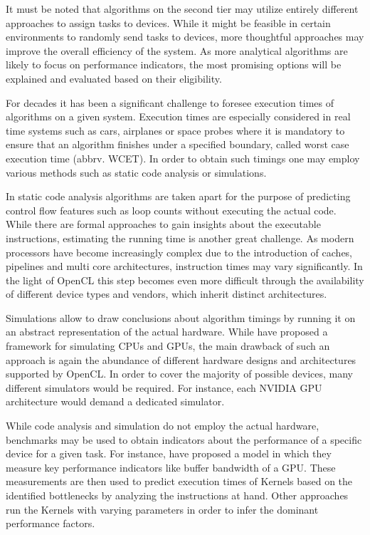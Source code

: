 It must be noted that algorithms on the second tier may utilize entirely different approaches to assign tasks to devices. While it might be feasible in certain environments to randomly send tasks to devices, more thoughtful approaches may improve the overall efficiency of the system. As more analytical algorithms are likely to focus on performance indicators, the most promising options will be explained and evaluated based on their eligibility.

For decades it has been a significant challenge to foresee execution times of algorithms on a given system. Execution times are especially considered in real time systems such as cars, airplanes or space probes where it is mandatory to ensure that an algorithm finishes under a specified boundary, called worst case execution time (abbrv. WCET). In order to obtain such timings one may employ various methods such as static code analysis or simulations\cite{wcet}.

In static code analysis algorithms are taken apart for the purpose of predicting control flow features such as loop counts without executing the actual code\cite{loopbound}\cite{sweet}. While there are formal approaches to gain insights about the executable instructions, estimating the running time is another great challenge. As modern processors have become increasingly complex due to the introduction of caches, pipelines and multi core architectures, instruction times may vary significantly\cite{wcet}. In the light of OpenCL this step becomes even more difficult through the availability of different device types and vendors, which inherit distinct architectures.

Simulations allow to draw conclusions about algorithm timings by running it on an abstract representation of the actual hardware\cite{wcet}. While \citeauthor{multi2sim} have proposed a framework for simulating CPUs and GPUs\cite{multi2sim}, the main drawback of such an approach is again the abundance of different hardware designs and architectures supported by OpenCL. In order to cover the majority of possible devices, many different simulators would be required. For instance, each NVIDIA GPU architecture would demand a dedicated simulator.

While code analysis and simulation do not employ the actual hardware, benchmarks may be used to obtain indicators about the performance of a specific device for a given task. For instance, \citeauthor{quantitative_performance} have proposed a model in which they measure key performance indicators like buffer bandwidth of a GPU\cite{quantitative_performance}. These measurements are then used to predict execution times of Kernels based on the identified bottlenecks by analyzing the instructions at hand. Other approaches run the Kernels with varying parameters in order to infer the dominant performance factors\cite{gpgpu_performance}.

